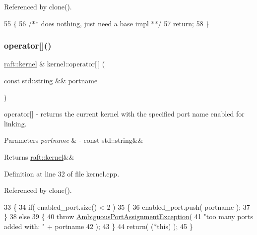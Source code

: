 Referenced by clone().


\begin{DoxyCode}
55 \{\textcolor{comment}{}
56 \textcolor{comment}{   /** does nothing, just need a base impl **/}
57    \textcolor{keywordflow}{return};
58 \}
\end{DoxyCode}
\hypertarget{classraft_1_1kernel_a186ea784c5b1ac8fd90f2112c1c62675}{}\label{classraft_1_1kernel_a186ea784c5b1ac8fd90f2112c1c62675} 
\subsubsection{\texorpdfstring{operator[]()}{operator[]()}}
{\footnotesize\ttfamily \hyperlink{classraft_1_1kernel}{raft\+::kernel} \& kernel\+::operator\mbox{[}$\,$\mbox{]} (\begin{DoxyParamCaption}\item[{const std\+::string \&\&}]{portname }\end{DoxyParamCaption})}

operator\mbox{[}\mbox{]} -\/ returns the current kernel with the specified port name enabled for linking. 
\begin{DoxyParams}{Parameters}
{\em portname} & -\/ const std\+::string\&\& \\
\hline
\end{DoxyParams}
\begin{DoxyReturn}{Returns}
\hyperlink{classraft_1_1kernel}{raft\+::kernel}\&\& 
\end{DoxyReturn}


Definition at line 32 of file kernel.\+cpp.



Referenced by clone().


\begin{DoxyCode}
33 \{
34    \textcolor{keywordflow}{if}( enabled\_port.size() < 2 )
35    \{
36         enabled\_port.push( portname );
37    \}
38    \textcolor{keywordflow}{else}
39    \{
40         \textcolor{keywordflow}{throw} \hyperlink{class_ambiguous_port_assignment_exception}{AmbiguousPortAssignmentException}(
41             \textcolor{stringliteral}{"too many ports added with: "} + portname
42         );
43    \}
44    \textcolor{keywordflow}{return}( (*\textcolor{keyword}{this}) );
45 \}
\end{DoxyCode}
\hypertarget{classraft_1_1kernel_a05094286d7577360fb1b91c91fc05901}{}\label{classraft_1_1kernel_a05094286d7577360fb1b91c91fc05901} 
